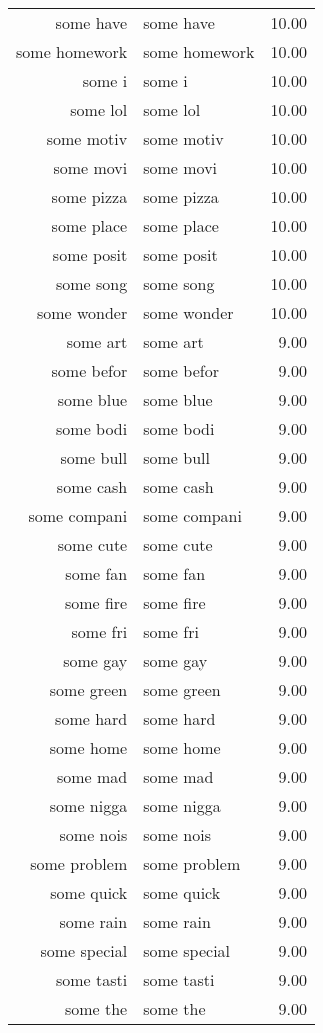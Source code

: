 \begin{table}[ht]
\begin{tabular}{rlr}
  some have & some have & 10.00 \\ 
  some homework & some homework & 10.00 \\ 
  some i & some i & 10.00 \\ 
  some lol & some lol & 10.00 \\ 
  some motiv & some motiv & 10.00 \\ 
  some movi & some movi & 10.00 \\ 
  some pizza & some pizza & 10.00 \\ 
  some place & some place & 10.00 \\ 
  some posit & some posit & 10.00 \\ 
  some song & some song & 10.00 \\ 
  some wonder & some wonder & 10.00 \\ 
  some art & some art & 9.00 \\ 
  some befor & some befor & 9.00 \\ 
  some blue & some blue & 9.00 \\ 
  some bodi & some bodi & 9.00 \\ 
  some bull & some bull & 9.00 \\ 
  some cash & some cash & 9.00 \\ 
  some compani & some compani & 9.00 \\ 
  some cute & some cute & 9.00 \\ 
  some fan & some fan & 9.00 \\ 
  some fire & some fire & 9.00 \\ 
  some fri & some fri & 9.00 \\ 
  some gay & some gay & 9.00 \\ 
  some green & some green & 9.00 \\ 
  some hard & some hard & 9.00 \\ 
  some home & some home & 9.00 \\ 
  some mad & some mad & 9.00 \\ 
  some nigga & some nigga & 9.00 \\ 
  some nois & some nois & 9.00 \\ 
  some problem & some problem & 9.00 \\ 
  some quick & some quick & 9.00 \\ 
  some rain & some rain & 9.00 \\ 
  some special & some special & 9.00 \\ 
  some tasti & some tasti & 9.00 \\ 
  some the & some the & 9.00 \\ 

\end{tabular}
\end{table}
